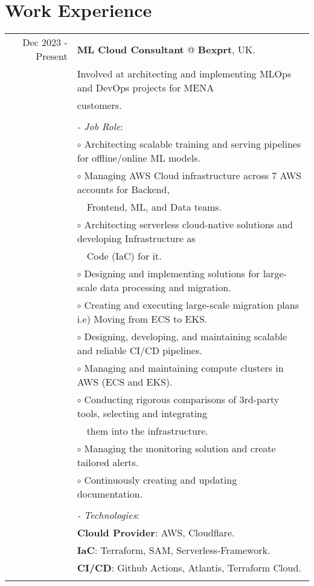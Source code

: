 \documentclass[a4paper,10pt]{article}
\begin{document}
\section{\textbf{Work Experience}}
\begin{longtable}{r|l}
    Dec 2023 - Present& \textbf{ML Cloud Consultant} @
    \textbf{Bexprt}, UK. \\&
    Involved at architecting and implementing MLOps and DevOps projects for MENA \\& customers. \\&
    \\&
    \textit{- Job Role}:\\&
    $\circ$ Architecting scalable training and serving pipelines for offline/online ML models. \\&
    $\circ$ Managing AWS Cloud infrastructure across 7 AWS accounts for Backend,\\&~~Frontend, ML, and Data teams. \\&
    $\circ$ Architecting serverless cloud-native solutions and developing Infrastructure as \\&~~Code (IaC) for it. \\&
    $\circ$ Designing and implementing solutions for large-scale data processing and migration. \\&
    $\circ$ Creating and executing large-scale migration plans i.e) Moving from ECS to EKS. \\&
    $\circ$ Designing, developing, and maintaining scalable and reliable CI/CD pipelines. \\&
    $\circ$ Managing and maintaining compute clusters in AWS (ECS and EKS). \\&
    $\circ$ Conducting rigorous comparisons of 3rd-party tools, selecting and integrating \\& ~~them into the infrastructure. \\&
    $\circ$ Managing the monitoring solution and create tailored alerts. \\&
    $\circ$ Continuously creating and updating documentation. \\&
    \\&
    \textit{- Technologies}:\\&
    \textbf{Clould Provider}: AWS, Cloudflare. \\&
    \textbf{IaC}: Terraform, SAM, Serverless-Framework. \\&
    \textbf{CI/CD}: Github Actions, Atlantis, Terraform Cloud. \\&

\end{longtable}
\end{document}
